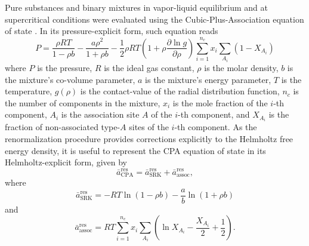 \documentclass[preprint,12pt,3p]{elsarticle}
\begin{document}
Pure substances and binary mixtures in vapor-liquid equilibrium and at supercritical conditions were evaluated using the Cubic-Plus-Association equation of state \citep{kontogeorgis1996equation}.
In its pressure-explicit form, such equation reads
\begin{equation} \label{eq:pressure_cpa}
P = \frac{\rho RT}{1-\rho b}-\frac{a \rho^2}{1+\rho b}-\frac{1}{2} \rho RT \left(1+\rho\frac{\partial \ln g}{\partial \rho}\right)\sum_{i=1}^{n_c} x_{i} \sum_{A_{i}}(1-X_{A_{i}})
\end{equation}
where $P$ is the pressure,
$R$ is the ideal gas constant,
$\rho$ is the molar density,
$b$ is the mixture's co-volume parameter,
$a$ is the mixture's energy parameter,
$T$ is the temperature,
$g(\rho)$ is the contact-value of the radial distribution function,
$n_c$ is the number of components in the mixture,
$x_{i}$ is the mole fraction of the $i$-th component,
$A_{i}$ is the association site $A$ of the $i$-th component, and
$X_{A_{i}}$ is the fraction of non-associated type-$A$ sites of the $i$-th component.
As the renormalization procedure provides corrections explicitly to the Helmholtz free energy density, it is useful to represent the CPA equation of state in its Helmholtz-explicit form, given by
\begin{equation} \label{eq:helm_res_cpa}
\bar{a}_\text{CPA}^\text{res} =\bar{a}_\text{SRK}^\text{res} + \bar{a}_\text{assoc}^\text{res},
\end{equation}
where
\begin{equation} \label{eq:helm_res_srk}
\bar{a}_\text{SRK}^\text{res} = -RT\ln(1-\rho b)-\frac{a}{b}\ln(1+\rho b)   
\end{equation}
and
\begin{equation} \label{eq:helm_res_assoc}
\bar{a}_\text{assoc}^\text{res} = RT\sum_{i=1}^{n_c} x_{i} \sum_{A_{i}}\left(\ln X_{A_{i}} - \frac{X_{A_{i}}}{2} + \frac{1}{2}\right).
\end{equation}
\end{document}
